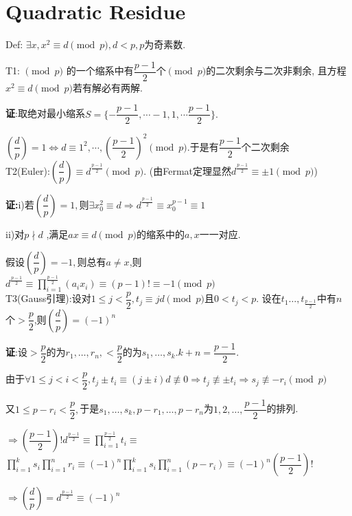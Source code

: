 \section{Quadratic Residue}
Def: $ \exists x,x^2\equiv d \pmod p,d<p,p$为奇素数.

T1: $ \pmod p$ 的一个缩系中有$	\dfrac{p-1}{2}$个$ \pmod p$的二次剩余与二次非剩余,
且方程$ x^2 \equiv d \pmod p$若有解必有两解.

{\bf 证}:取绝对最小缩系$ S = \{ -\dfrac{p-1}{2},\cdots -1, 1,\cdots \dfrac{p-1}{2}\}.$ 

$ (\dfrac{d}{p})= 1\Leftrightarrow d \equiv 1^2,\cdots,(\dfrac{p-1}{2})^2 \pmod p. $于是有$ \dfrac{p-1}{2}$个二次剩余
\\

T2(Euler):$ ( \dfrac{d}{p} )\equiv d^{\frac{p-1}{2}} \pmod p$.
(由Fermat定理显然$ d^{\frac{p-1}{2}}\equiv \pm 1 \pmod p$)

{\bf 证:}i)若$ (\dfrac{d}{p})=1,$则$ \exists x_0^2\equiv d\Rightarrow d^{\frac{p-1}{2}}\equiv x_0^{p-1}\equiv 1$

ii)对$ p \nmid d$ ,满足$ ax\equiv d\pmod p$的缩系中的$ a,x$一一对应.

假设$ (\dfrac{d}{p})=-1,$则总有$ a\ne x$,则$ d^{\frac{p-1}{2}}\equiv \prod_{i=1}^{\frac{p-1}{2}}{(a_ix_i)}\equiv (p-1)!\equiv -1\pmod p$
\\

T3(Gauss引理):设对$ 1\le j < \dfrac{p}{2},t_j\equiv jd \pmod p$且$ 0<t_j<p$.
设在$ t_1\ldots,t_{\frac{p-1}{2}}$中有$ n$个$ >\dfrac{p}{2}$,则$ (\dfrac{d}{p})=(-1)^n$

{\bf 证}:设$ >\dfrac{p}{2}$的为$ r_1,\ldots,r_n,<\dfrac{p}{2}$的为$ s_1,\ldots,s_k.k+n=\dfrac{p-1}{2}$.

由于$ \forall 1\le j<i<\dfrac{p}{2},t_j\pm t_i\equiv (j\pm i)d \not \equiv 0\Rightarrow t_j\not\equiv \pm t_i\Rightarrow s_j\not\equiv -r_i\pmod p$

又$ 1\le p-r_i<\dfrac{p}{2},$于是$ s_1,\ldots,s_k,p-r_1,\ldots,p-r_n$为$ 1,2,\ldots,\dfrac{p-1}{2}$的排列.

$ \Rightarrow (\dfrac{p-1}{2})!d^{\frac{p-1}{2}}\equiv \prod_{i=1}^{\frac{p-1}{2}}{t_i}\equiv$ 
$\prod_{i=1}^{k}{s_i}\prod_{i=1}^{n}{r_i}\equiv (-1)^n\prod_{i=1}^{k}{s_i}\prod_{i=1}^{n}{(p-r_i)}\equiv (-1)^n(\dfrac{p-1}{2})!$

$ \Rightarrow (\dfrac{d}{p})=d^{\frac{p-1}{2}}\equiv(-1)^n$
